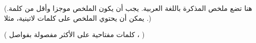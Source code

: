 \begin{abstractAr}
	(هنا تضع ملخص المذكرة باللغة العربية. يجب أن يكون الملخص موجزا وأقل من
	كلمة. يمكن أن يحتوي الملخص على كلمات لاتينية، مثلا 
	.)
\end{abstractAr}

\begin{keywordsAr}
	(
	 كلمات مفتاحية على الأكثر مفصولة بفواصل 
	 ،
	 )
\end{keywordsAr}